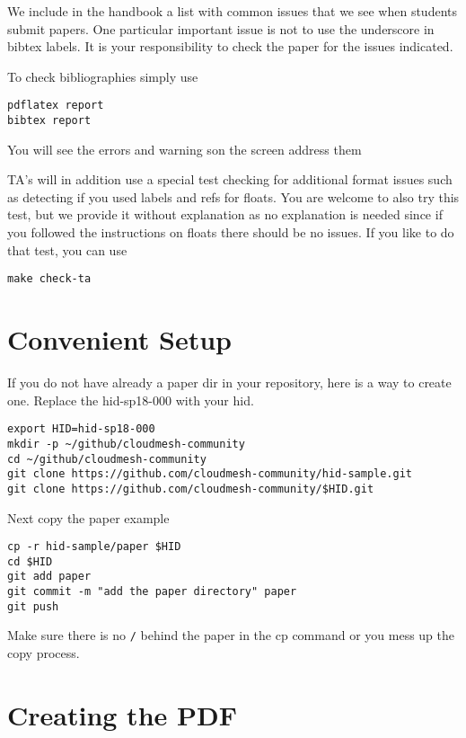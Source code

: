 We include in the handbook a list with common issues that we see when
students submit papers. One particular important issue is not to use
the underscore in bibtex labels. It is your responsibility to check
the paper for the issues indicated.

To check bibliographies simply use

\begin{verbatim}
pdflatex report
bibtex report
\end{verbatim}

You will see the errors and warning son the screen address them

TA's will in addition use a special test checking for additional
format issues such as detecting if you used labels and refs for
floats. You are welcome to also try this test, but we provide it
without explanation as no explanation is needed since if you followed
the instructions on floats there should be no issues. If you like to
do that test, you can use  

\begin{verbatim}
make check-ta
\end{verbatim}

\section{Convenient Setup}

If you do not have already a paper dir in your repository, here is a
way to create one. Replace the hid-sp18-000 with your hid.

\begin{verbatim}
export HID=hid-sp18-000
mkdir -p ~/github/cloudmesh-community
cd ~/github/cloudmesh-community
git clone https://github.com/cloudmesh-community/hid-sample.git
git clone https://github.com/cloudmesh-community/$HID.git
\end{verbatim}

Next copy the paper example

\begin{verbatim}
cp -r hid-sample/paper $HID
cd $HID
git add paper
git commit -m "add the paper directory" paper
git push
\end{verbatim}

Make sure there is no \verb|/| behind the paper in the cp command or you mess up the
copy process.


\section{Creating the PDF}

